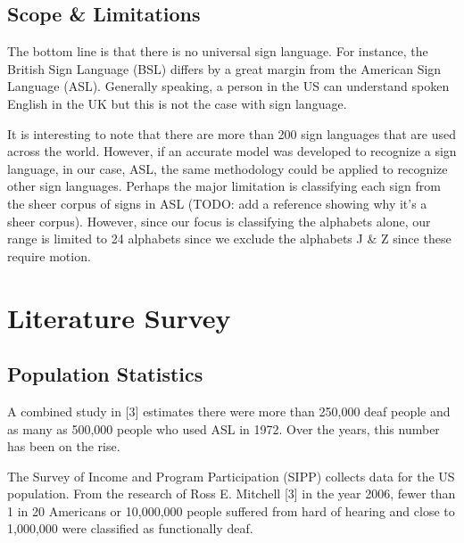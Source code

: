 \documentclass[twocolumn]{article}
\begin{document}
\subsection{Scope \& Limitations}
The bottom line is that there is no universal sign language. For instance, the 
British Sign Language (BSL) differs by a great margin from the American Sign 
Language (ASL). Generally speaking, a person in the US can understand spoken 
English in the UK but this is not the case with sign language.

It is interesting to note that there are more than 200 sign languages that are 
used across the world. However, if an accurate model was developed to 
recognize a sign language, in our case, ASL, the same methodology could be 
applied to recognize other sign languages. Perhaps the major limitation is 
classifying each sign from the sheer corpus of signs in ASL (TODO: add a 
reference showing why it’s a sheer corpus). However, since our focus is 
classifying the alphabets alone, our range is limited to 24 alphabets since we 
exclude the alphabets J \& Z since these require motion.

\section{Literature Survey}

\subsection{Population Statistics}
A combined study in [3] estimates there were more than 250,000 deaf people and 
as many as 500,000 people who used ASL in 1972. Over the years, this number 
has been on the rise.

The Survey of Income and Program Participation (SIPP) collects data for the US 
population. From the research of Ross E. Mitchell [3] in the year 2006, fewer 
than 1 in 20 Americans or 10,000,000 people suffered from hard of hearing and 
close to 1,000,000 were classified as functionally deaf.
\end{document}

